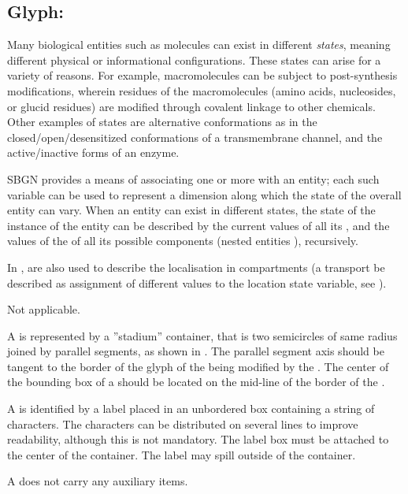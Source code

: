 
\subsection{Glyph: }
\label{sec:stateVariable}

Many biological entities such as molecules can exist in different \emph{states}, meaning different physical or informational configurations.  These states can arise for a variety of reasons.  For example, macromolecules can be subject to post-synthesis modifications, wherein residues of the macromolecules (amino acids, nucleosides, or glucid residues) are modified through covalent linkage to other chemicals.  Other examples of states are alternative conformations as in the closed/open/desensitized conformations of a transmembrane channel, and the active/inactive forms of an enzyme.

SBGN provides a means of associating one or more  with an entity; each such variable can be used to represent a dimension along which the state of the overall entity can vary.  When an entity can exist in different states, the state of the instance of the entity %
can be described by the current values of all its , and the values of the  of all its possible components (nested entities ), recursively.

In \SBGNERLone,  are also used to describe the localisation in compartments (a transport   be described as assignment of different values to the location state variable, see ).

\begin{glyphDescription}

\glyphSboTerm Not applicable.

\glyphContainer A  is represented by a ''stadium'' container, that is two semicircles of same radius joined by parallel segments, as shown in .  The parallel segment axis should be tangent to the border of the glyph of the  being modified by the . The center of the bounding box of a  should be located on the mid-line of the border of the .

\glyphLabel A  is identified by a label placed in an unbordered box containing a string of characters.  The characters can be distributed on several lines to improve readability, although this is not mandatory.  The label box must be attached to the center of the container.  The label may spill outside of the container.

\glyphAux A  does not carry any auxiliary items.  

\end{glyphDescription}


